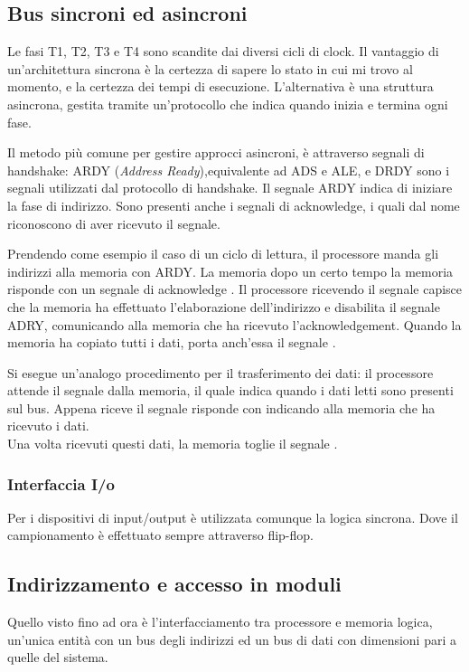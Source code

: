 \documentclass[../template]{subfiles}
\begin{document}
\subsection{Bus sincroni ed asincroni}
Le fasi T1, T2, T3 e T4 sono scandite dai diversi cicli di clock.
Il vantaggio di un'architettura sincrona è la certezza di sapere lo stato in cui mi trovo al momento, e la certezza dei tempi di esecuzione. L'alternativa è una struttura asincrona, gestita tramite un'protocollo che indica quando inizia e termina ogni fase.

Il metodo più comune per gestire approcci asincroni, è attraverso segnali di handshake:
ARDY (\textit{Address Ready}),equivalente ad ADS e ALE, e DRDY sono i segnali utilizzati dal protocollo di handshake.
Il segnale ARDY indica di iniziare la fase di indirizzo.
Sono presenti anche i segnali di acknowledge, i quali dal nome riconoscono di aver ricevuto il segnale.

Prendendo come esempio il caso di un ciclo di lettura, il processore manda gli indirizzi alla memoria con ARDY. La memoria dopo un certo tempo la memoria risponde con un segnale di acknowledge .
Il processore ricevendo il segnale  capisce che la memoria ha effettuato l'elaborazione dell'indirizzo e disabilita il segnale ADRY, comunicando alla memoria che ha ricevuto l'acknowledgement.
Quando la memoria ha copiato tutti i dati, porta anch'essa il segnale .

Si esegue un'analogo procedimento per il trasferimento dei dati: il processore attende il segnale  dalla memoria, il quale indica quando i dati letti sono presenti sul bus. Appena riceve il segnale risponde con  indicando alla memoria che ha ricevuto i dati.
\\
Una volta ricevuti questi dati, la memoria toglie il segnale .
\subsubsection{Interfaccia I/o}
Per i dispositivi di input/output è utilizzata comunque la logica sincrona. Dove il campionamento è effettuato sempre attraverso flip-flop.

\subsection{Indirizzamento e accesso in moduli}
Quello visto fino ad ora è l'interfacciamento tra processore e memoria logica, un'unica entità con un bus degli indirizzi ed un bus di dati con dimensioni pari a quelle del sistema.
\end{document}
